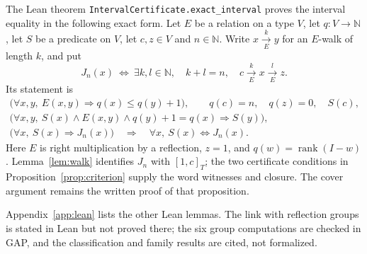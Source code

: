 \documentclass[11pt]{article}
\theoremstyle{definition}
\newcommand{\rank}{\operatorname{rank}}
\begin{document}
The Lean theorem \texttt{IntervalCertificate.exact\_interval} proves
the interval equality in the following exact form. Let $E$ be a relation
on a type $V$, let $q:V\to\mathbb N$, let $S$ be a predicate on $V$,
let $c,z\in V$ and $n\in\mathbb N$. Write $x\xrightarrow[E]{k}y$
for an $E$-walk of length $k$, and put
\[
 J_n(x)\ \Longleftrightarrow\
 \exists k,l\in\mathbb N,\quad k+l=n,\quad
 c\xrightarrow[E]{k}x\xrightarrow[E]{l}z.
\]
Its statement is
\[
\begin{gathered}
 \bigl(\forall x,y,\ E(x,y)\Rightarrow q(x)\leq q(y)+1\bigr),\qquad
 q(c)=n,\quad q(z)=0,\quad S(c),\\
 \bigl(\forall x,y,\ S(x)\land E(x,y)\land q(y)+1=q(x)
                 \Rightarrow S(y)\bigr),\\
 \bigl(\forall x,\ S(x)\Rightarrow J_n(x)\bigr)
 \quad\Longrightarrow\quad
 \forall x,\ S(x)\Longleftrightarrow J_n(x).
\end{gathered}
\]
Here $E$ is right multiplication by a reflection, $z=1$, and
$q(w)=\rank(I-w)$. Lemma~\ref{lem:walk} identifies $J_n$ with
$[1,c]_T$; the two certificate conditions in
Proposition~\ref{prop:criterion} supply the word witnesses and closure.
The cover argument remains the written proof of that proposition.

Appendix~\ref{app:lean} lists the other Lean lemmas. The link with
reflection groups is stated in Lean but not proved there; the six
group computations are checked in GAP, and the classification and
family results are cited, not formalized.
\end{document}
